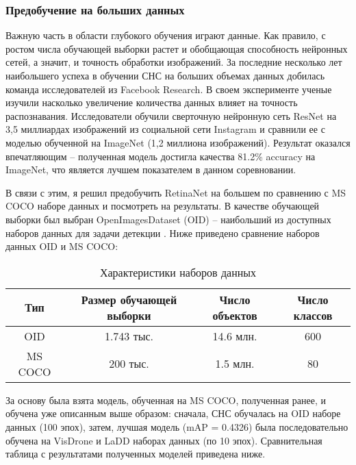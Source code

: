 \subsubsection{Предобучение на больших данных} \label{sect-6-2}

Важную часть в области глубокого обучения играют данные. Как правило, с ростом числа обучающей выборки растет и обобщающая способность нейронных сетей, а значит, и точность обработки изображений. За последние несколько лет наибольшего успеха в обучении СНС на больших объемах данных добилась команда исследователей из Facebook Research. В своем эксперименте \cite{lib-insta-net} ученые изучили насколько увеличение количества данных влияет на точность распознавания. Исследователи обучили сверточную нейронную сеть ResNet на 3,5 миллиардах изображений из социальной сети Instagram и сравнили ее с моделью обученной на ImageNet (1,2 миллиона изображений). Результат оказался впечатляющим -- полученная модель достигла качества 81.2\% accuracy на ImageNet, что является лучшем показателем в данном соревновании. 


В связи с этим, я решил предобучить RetinaNet на большем по сравнению с MS COCO наборе данных и посмотреть на результаты. В качестве обучающей выборки был выбран OpenImagesDataset (OID) -- наибольший из доступных наборов данных для задачи детекции \cite{lib-iod}. Ниже приведено сравнение наборов данных OID и MS COCO:

\begin{table}[H]
    \caption{Характеристики наборов данных}\label{datasets}
    \begin{tabular}{|c|c|c|c|}
        \hline
        {Тип} & {Размер обучающей выборки} & {Число объектов} & {Число классов} \\
        \hline
        OID & 1.743 тыс. & 14.6 млн. & 600 \\
        \hline
        MS COCO & 200 тыс. & 1.5 млн. & 80 \\
        \hline
    \end{tabular}
\end{table}

За основу была взята модель, обученная на MS COCO, полученная ранее, и обучена уже описанным выше образом: сначала, СНС обучалась на OID наборе данных (100 эпох), затем, лучшая модель (mAP = 0.4326) была последовательно обучена на VisDrone и LaDD наборах данных (по 10 эпох). Сравнительная таблица с результатами полученных моделей приведена ниже.

